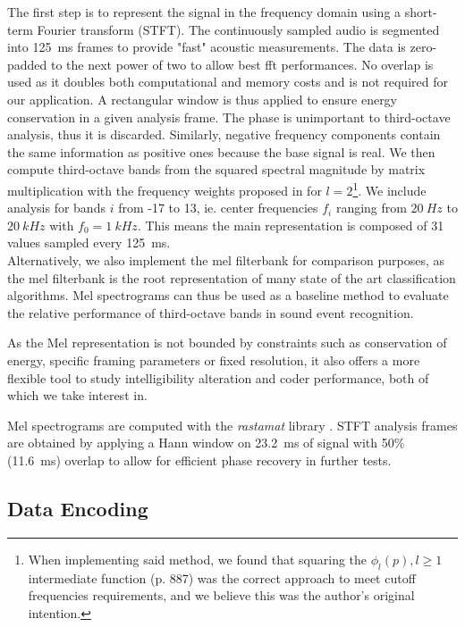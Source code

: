 \documentclass[final,3p,times,twocolumn]{elsarticle}
\begin{document}
The first step is to represent the signal in the frequency domain using a short-term Fourier transform (STFT). The continuously sampled audio is segmented into 125~ms frames to provide "fast" acoustic measurements. The data is zero-padded to the next power of two to allow best fft performances. No overlap is used as it doubles both computational and memory costs and is not required for our application. A rectangular window is thus applied to ensure energy conservation in a given analysis frame. The phase is unimportant to third-octave analysis, thus it is discarded. Similarly, negative frequency components contain the same information as positive ones because the base signal is real. We then compute third-octave bands from the squared spectral magnitude by matrix multiplication with the frequency weights proposed in \cite{antoni2010} for $l = 2$\footnote{When implementing said method, we found that squaring the $\phi_l(p), l \geq 1$ intermediate function (p. 887) was the correct approach to meet cutoff frequencies requirements, and we believe this was the author's original intention.}. We include analysis for bands $i$ from -17 to 13, ie. center frequencies $f_i$ ranging from $20~Hz$ to $20~kHz$ with $f_0 = 1~kHz$. This means the main representation is composed of 31 values sampled every 125~ms.\\

Alternatively, we also implement the mel filterbank for comparison purposes, as the mel filterbank is the root representation of many state of the art classification algorithms. Mel spectrograms can thus be used as a baseline method to evaluate the relative performance of third-octave bands in sound event recognition.

As the Mel representation is not bounded by constraints such as conservation of energy, specific framing parameters or fixed resolution, it also offers a more flexible tool to study intelligibility alteration and coder performance, both of which we take interest in.

Mel spectrograms are computed with the \textit{rastamat} library \cite{ellis2005}. STFT analysis frames are obtained by applying a Hann window on 23.2~ms of signal with 50\% (11.6~ms) overlap to allow for efficient phase recovery in further tests.

\subsection{Data Encoding}
\end{document}
